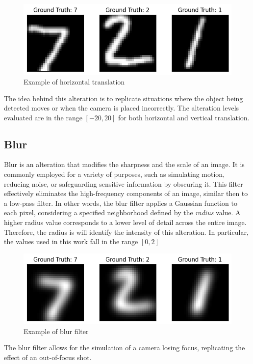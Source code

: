 \begin{figure}[h]
	\centering
	\includegraphics[width=0.6\linewidth]{ImageFiles/Alterations/HT}
	\caption{Example of horizontal translation}
	\label{fig:HT}
\end{figure}

The idea behind this alteration is to replicate situations where the object being detected moves or when the camera is placed incorrectly. The alteration levels evaluated are in the range $[-20,20]$ for both horizontal and vertical translation.

\subsection{Blur}

Blur is an alteration that modifies the sharpness and the scale of an image. It is commonly employed for a variety of purposes, such as simulating motion, reducing noise, or safeguarding sensitive information by obscuring it. This filter effectively eliminates the high-frequency components of an image, similar then to a low-pass filter. In other words, the blur filter applies a Gaussian function to each pixel, considering a specified neighborhood defined by the \textit{radius} value. A higher radius value corresponds to a lower level of detail across the entire image. Therefore, the radius is will identify the intensity of this alteration. In particular, the values used in this work fall in the range $[0,2]$

\begin{figure}[h]
	\centering
	\includegraphics[width=0.6\linewidth]{ImageFiles/Alterations/Blur}
	\caption{Example of blur filter}
	\label{fig:Blur}
\end{figure}

The blur filter allows for the simulation of a camera losing focus, replicating the effect of an out-of-focus shot.

